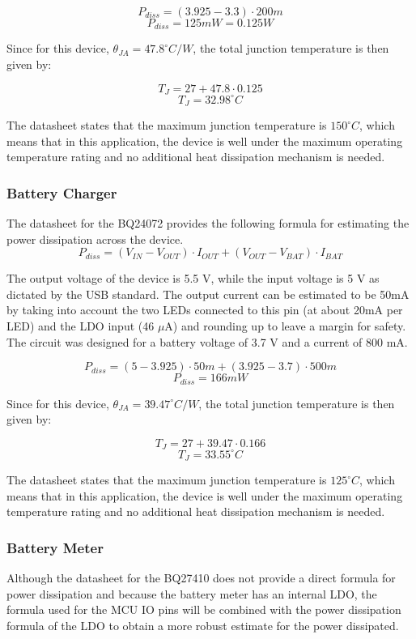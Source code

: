 \[P_{diss} = \left(3.925 - 3.3\right)\cdot 200m\]
\[\boxed{P_{diss} = 125mW = 0.125W}\]

Since for this device, $\theta_{JA} = 47.8^\circ C/W$, the total junction temperature is then given by:

\[T_J = 27 + 47.8 \cdot 0.125 \]
\[\boxed{T_J = 32.98 ^\circ C}\]

The datasheet states that the maximum junction temperature is $150^\circ C$, which means that in this application, the device is well under the maximum operating temperature rating and no additional heat dissipation mechanism is needed.


\subsubsection{Battery Charger}

The datasheet for the BQ24072 provides the following formula for estimating the power dissipation across the device.
\[P_{diss} = \left(V_{IN} - V_{OUT}\right)\cdot I_{OUT} + \left(V_{OUT} - V_{BAT}\right)\cdot I_{BAT}\]

The output voltage of the device is 5.5 V, while the input voltage is 5 V as dictated by the USB standard.  The output current can be estimated to be 50mA by taking into account the two LEDs connected to this pin (at about 20mA per LED) and the LDO input (46 $\mu$A) and rounding up to leave a margin for safety.  The circuit was designed for a battery voltage of 3.7 V and a current of 800 mA.

\[P_{diss} = \left(5 - 3.925\right)\cdot 50m + \left(3.925 - 3.7\right)\cdot 500m\]
\[\boxed{P_{diss} = 166 mW}\]

Since for this device, $\theta_{JA} = 39.47^\circ C/W$, the total junction temperature is then given by:

\[T_J = 27 + 39.47 \cdot 0.166 \]
\[\boxed{T_J = 33.55 ^\circ C}\]

The datasheet states that the maximum junction temperature is $125^\circ C$, which means that in this application, the device is well under the maximum operating temperature rating and no additional heat dissipation mechanism is needed.


\subsubsection{Battery Meter}
Although the datasheet for the BQ27410 does not provide a direct formula for power dissipation and because the battery meter has an internal LDO, the formula used for the MCU IO pins will be combined with the power dissipation formula of the LDO to obtain a more robust estimate for the power dissipated.  

